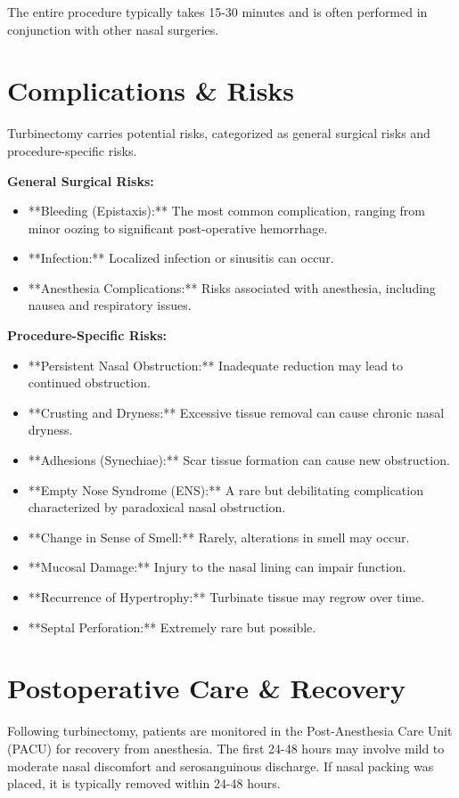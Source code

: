 The entire procedure typically takes 15-30 minutes and is often performed in conjunction with other nasal surgeries.

\section*{Complications \& Risks}
Turbinectomy carries potential risks, categorized as general surgical risks and procedure-specific risks.

\textbf{General Surgical Risks:}
\begin{itemize}
  \item **Bleeding (Epistaxis):** The most common complication, ranging from minor oozing to significant post-operative hemorrhage.
  \item **Infection:** Localized infection or sinusitis can occur.
  \item **Anesthesia Complications:** Risks associated with anesthesia, including nausea and respiratory issues.
\end{itemize}

\textbf{Procedure-Specific Risks:}
\begin{itemize}
  \item **Persistent Nasal Obstruction:** Inadequate reduction may lead to continued obstruction.
  \item **Crusting and Dryness:** Excessive tissue removal can cause chronic nasal dryness.
  \item **Adhesions (Synechiae):** Scar tissue formation can cause new obstruction.
  \item **Empty Nose Syndrome (ENS):** A rare but debilitating complication characterized by paradoxical nasal obstruction.
  \item **Change in Sense of Smell:** Rarely, alterations in smell may occur.
  \item **Mucosal Damage:** Injury to the nasal lining can impair function.
  \item **Recurrence of Hypertrophy:** Turbinate tissue may regrow over time.
  \item **Septal Perforation:** Extremely rare but possible.
\end{itemize}

\section*{Postoperative Care \& Recovery}
Following turbinectomy, patients are monitored in the Post-Anesthesia Care Unit (PACU) for recovery from anesthesia. The first 24-48 hours may involve mild to moderate nasal discomfort and serosanguinous discharge. If nasal packing was placed, it is typically removed within 24-48 hours. 

